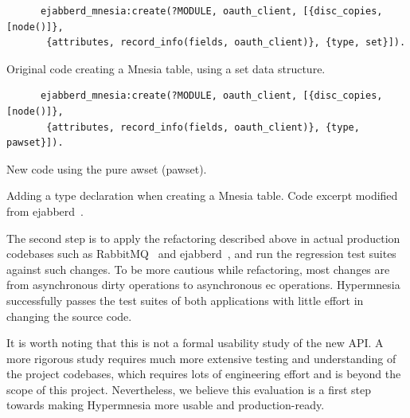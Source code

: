 \begin{listing}[htp]
  \centering 
  \begin{sublisting}[t]{\columnwidth}
    \centering
    \begin{verbatim}
      ejabberd_mnesia:create(?MODULE, oauth_client, [{disc_copies, [node()]},
       {attributes, record_info(fields, oauth_client)}, {type, set}]).
    \end{verbatim}
    \caption{Original code creating a Mnesia table, using a set data structure.}
  \end{sublisting}
  
  \begin{sublisting}[t]{\columnwidth}
    \centering
    \begin{verbatim}
      ejabberd_mnesia:create(?MODULE, oauth_client, [{disc_copies, [node()]},
       {attributes, record_info(fields, oauth_client)}, {type, pawset}]).
    \end{verbatim}
    \caption{New code using the pure \acrshort{awset} (pawset).}
  \end{sublisting} 
  \caption{Adding a type declaration when creating a Mnesia table. Code excerpt
  modified from ejabberd~\cite{processone2023ejabberd}.}
  \label{lst:hypermnesia type decl}
\end{listing}

The second step is to apply the refactoring described above in actual production
codebases such as RabbitMQ~\cite{vmware2023rabbitmq} and 
ejabberd~\cite{processone2023ejabberd}, and run the regression test suites against
such changes. To be more cautious while refactoring, most changes
are from asynchronous dirty operations to asynchronous \acrshort{ec} operations. 
Hypermnesia successfully passes the test suites of both applications with little
effort in changing the source code.

It is worth noting that this is not a formal usability study of the new API.
A more rigorous study requires much more extensive testing and understanding
of the project codebases, which requires lots of engineering effort and is beyond
the scope of this project. Nevertheless, we believe this evaluation is a first
step towards making Hypermnesia more usable and production-ready.



